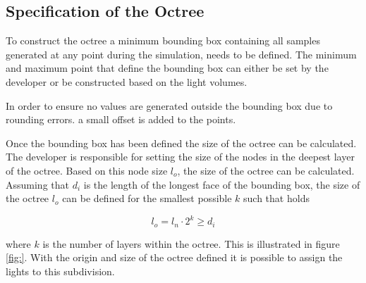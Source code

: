 \subsection{Specification of the Octree}



To construct the octree a minimum bounding box containing all samples generated
at any point during the simulation, needs to be defined. The minimum and maximum point
that define the bounding box can either be set by the developer or be constructed based
on the light volumes.

In order to ensure no values are generated outside the bounding box due to rounding errors.
a small offset is added to the points.

Once the bounding box has been defined the size of the octree can be calculated.
The developer is responsible for setting the size of the nodes in the deepest layer of
the octree. Based on this node size $\mathit{l}_o$, the size of the octree can be calculated.
Assuming that $\mathit{d}_i$ is the length of the longest face of the bounding box, the
size of the octree $\mathit{l}_o$ can be defined for the smallest possible $k$ such that holds

\begin{equation*}
  \mathit{l}_o = \mathit{l}_n \cdot 2^k \geq \mathit{d}_i
\end{equation*}

\noindent where $k$ is the number of layers within the octree. This is illustrated in figure
\ref{fig:}. With the origin and size of the octree defined it is possible to assign the
lights to this subdivision.



